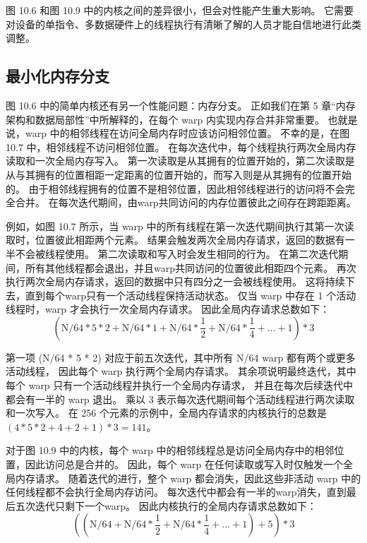 图 10.6 和图 10.9 中的内核之间的差异很小，但会对性能产生重大影响。 
它需要对设备的单指令、多数据硬件上的线程执行有清晰了解的人员才能自信地进行此类调整。

\subsection{最小化内存分支}
图 10.6 中的简单内核还有另一个性能问题：内存分支。 
正如我们在第 5 章“内存架构和数据局部性”中所解释的，在每个 warp 内实现内存合并非常重要。 
也就是说，warp 中的相邻线程在访问全局内存时应该访问相邻位置。 
不幸的是，在图 10.7 中，相邻线程不访问相邻位置。 在每次迭代中，每个线程执行两次全局内存读取和一次全局内存写入。 
第一次读取是从其拥有的位置开始的，第二次读取是从与其拥有的位置相距一定距离的位置开始的，而写入则是从其拥有的位置开始的。 
由于相邻线程拥有的位置不是相邻位置，因此相邻线程进行的访问将不会完全合并。 
在每次迭代期间，由warp共同访问的内存位置彼此之间存在跨距距离。

例如，如图 10.7 所示，当 warp 中的所有线程在第一次迭代期间执行其第一次读取时，位置彼此相距两个元素。 
结果会触发两次全局内存请求，返回的数据有一半不会被线程使用。 第二次读取和写入时会发生相同的行为。 
在第二次迭代期间，所有其他线程都会退出，并且warp共同访问的位置彼此相距四个元素。 
再次执行两次全局内存请求，返回的数据中只有四分之一会被线程使用。 
这将持续下去，直到每个warp只有一个活动线程保持活动状态。 
仅当 warp 中存在 1 个活动线程时，warp 才会执行一次全局内存请求。 因此全局内存请求总数如下：
$$
\left(\mathrm{N} / 64* 5* 2+\mathrm{N} / 64* 1+\mathrm{N} / 64*\frac{1}{2}+\mathrm{N} / 64*\frac{1}{4}+\ldots+1\right)* 3
$$

第一项 (N/64 * 5 * 2) 对应于前五次迭代，其中所有 N/64 warp 都有两个或更多活动线程，
因此每个 warp 执行两个全局内存请求。 其余项说明最终迭代，其中每个 warp 只有一个活动线程并执行一个全局内存请求，
并且在每次后续迭代中都会有一半的 warp 退出。 乘以 3 表示每次迭代期间每个活动线程进行两次读取和一次写入。 
在 256 个元素的示例中，全局内存请求的内核执行的总数是 $(4 * 5 * 2+4+2+1) * 3 = 141$。

对于图 10.9 中的内核，每个 warp 中的相邻线程总是访问全局内存中的相邻位置，因此访问总是合并的。 
因此，每个 warp 在任何读取或写入时仅触发一个全局内存请求。 
随着迭代的进行，整个 warp 都会消失，因此这些非活动 warp 中的任何线程都不会执行全局内存访问。 
每次迭代中都会有一半的warp消失，直到最后五次迭代只剩下一个warp。 因此内核执行的全局内存请求总数如下：
$$
\left(\left(\mathrm{N} / 64+\mathrm{N} / 64*\frac{1}{2}+\mathrm{N} / 64*\frac{1}{4}+\ldots+1\right)+5\right)* 3
$$

